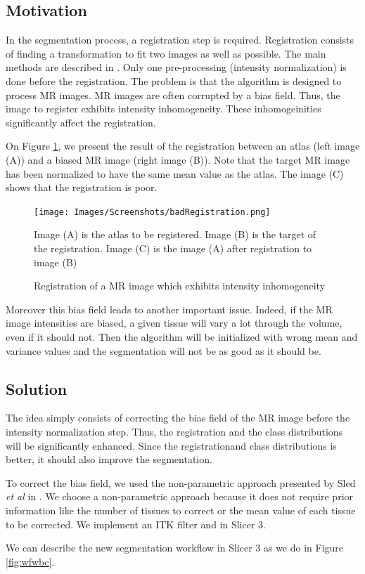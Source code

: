 \subsection{Motivation}

In the segmentation process, a registration step is required. Registration consists of finding a transformation to fit two images as well as possible. The main methods are described in \cite{21}. Only one pre-processing (intensity normalization) is done before the registration. The problem is that the algorithm is designed to process MR images. MR images are often corrupted by a bias field. Thus, the image to register exhibits intensity inhomogeneity. These inhomogeinities significantly affect the registration.
\par
On Figure \ref{fig:bfexemple}, we present the result of the registration between an atlas (left image (A)) and a biased MR image (right image (B)). Note that the target MR image has been normalized to have the same mean value as the atlas. The image (C) shows that the registration is poor.

  \begin{figure}[ht]\centering
  \texttt{[image: Images/Screenshots/badRegistration.png]}
  \caption{Registration of a MR image which exhibits intensity inhomogeneity}{Image (A) is the atlas to be registered. Image (B) is the target of the registration. Image (C) is the image (A) after registration to image (B)}\label{fig:bfexemple}
  \end{figure}
  
\par
Moreover this bias field leads to another important issue. Indeed, if the MR image intensities are biased, a given tissue will vary a lot through the volume, even if it should not. Then the algorithm will be initialized with wrong mean and variance values and the segmentation will not be as good as it should be.
  
\subsection{Solution}

The idea simply consists of correcting the bias field of the MR image before the intensity normalization step. Thus, the registration and the class distributions will be significantly enhanced. Since the registrationand class distributions is better, it should also improve the segmentation.
\par
To correct the bias field, we used the non-parametric approach presented by Sled \textit{et al} in \cite{19}. We choose a non-parametric approach because it does not require prior information like the number of tissues to correct or the mean value of each tissue to be corrected. We implement an ITK filter \cite{13} and \cite{14} in Slicer 3. 
\par
We can describe the new segmentation workflow in Slicer 3 as we do in Figure \ref{fig:wfwbc}.

